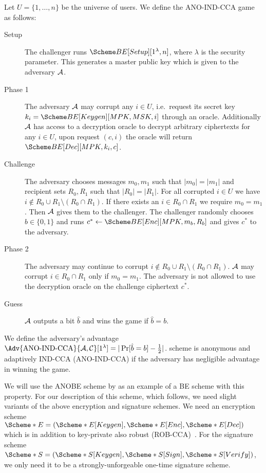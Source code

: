 \begin{definition}\label{ANO-IND-CCA}
  Let \(U = \{1, \ldots, n\}\) be the universe of users.
  We define the ANO-IND-CCA game as follows:
  \begin{description}
    \item[Setup] The challenger runs \(\BE[Setup][1^\lambda, n]\), where 
      \(\lambda\) is the security parameter.
      This generates a master public key which is given to the adversary 
      \(\A\).

    \item[Phase 1] The adversary \(\A\) may corrupt any \(i\in U\), i.e.\ 
      request its secret key \(k_i = \BE[Keygen][MPK, MSK, i]\) through an 
      oracle.
      Additionally \(\A\) has access to a decryption oracle to decrypt 
      arbitrary ciphertexts for any \(i\in U\), upon request \((c, i)\) the 
      oracle will return \(\BE[Dec][MPK, k_i, c]\).

    \item[Challenge] The adversary chooses messages \(m_0, m_1\) such that 
      \(|m_0| = |m_1|\) and recipient sets \(R_0, R_1\) such that \(|R_0| 
        = |R_1|\).
      For all corrupted \(i\in U\) we have \(i\notin R_0\cup R_1\setminus 
        (R_0\cap R_1)\).
      If there exists an \(i\in R_0\cap R_1\) we require \(m_0 = m_1\).
      Then \(\A\) gives them to the challenger.
      The challenger randomly chooses \(b\in \{0, 1\}\) and runs \(c^*\gets 
        \BE[Enc][MPK, m_b, R_b]\) and gives \(c^*\) to the adversary.

    \item[Phase 2] The adversary may continue to corrupt \(i\notin R_0\cup 
        R_1\setminus (R_0\cap R_1)\).
      \(\A\) may corrupt \(i\in R_0\cap R_1\) only if \(m_0 = m_1\).
      The adversary is not allowed to use the decryption oracle on the 
      challenge ciphertext \(c^*\).

    \item[Guess] \(\A\) outputs a bit \(\hat{b}\) and wins the game if 
      \(\hat{b} = b\).

  \end{description}
  We define the adversary's advantage \(\Adv{\text{ANO-IND-CCA}}{\A, 
      \Cop}[1^\lambda] = |\Pr[ \hat{b} = b ] - \frac{1}{2}|\).
   scheme is anonymous and adaptively IND-CCA (ANO-IND-CCA) if the 
  adversary has negligible advantage in winning the game.
\end{definition}

We will use the \ac{ANOBE} scheme by \citet{ANOBE} as an example of a \ac{BE} 
scheme with this property.
For our description of this scheme, which follows, we need slight variants of 
the above encryption and signature schemes.
We need an encryption scheme \(\E* = (\E*[Keygen], \E*[Enc], \E*[Dec])\) which 
is in addition to key-private also robust (ROB-CCA)~\cite{RobustEncryption}.
For the signature scheme \(\S* = (\S*[Keygen], \S*[Sign], \S*[Verify])\), we 
only need it to be a strongly-unforgeable one-time signature scheme.
